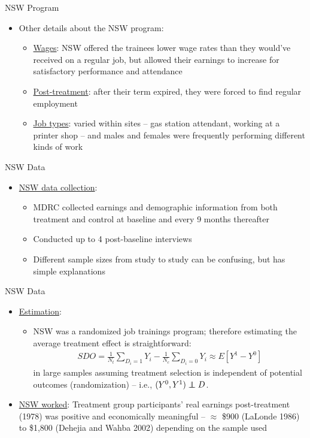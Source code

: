 \documentclass{beamer}
\newcommand\independent{\protect\mathpalette{\protect\independenT}{\perp}}
\def\independenT#1#2{\mathrel{\rlap{$#1#2$}\mkern2mu{#1#2}}}
\begin{document}
\begin{frame}{NSW Program}

\begin{itemize}
	\item Other details about the NSW program:
		\begin{itemize}
		\item \underline{Wages}:  NSW offered the trainees lower wage rates than they would've received on a regular job, but allowed their earnings to increase for satisfactory performance and attendance
		\item \underline{Post-treatment}: after their term expired, they were forced to find regular employment
		\item \underline{Job types}:  varied within sites -- gas station attendant, working at a printer shop -- and males and females were frequently performing different kinds of work
		\end{itemize}
\end{itemize}

\end{frame}
	
\begin{frame}{NSW Data}
	
	\begin{itemize}
	\item \underline{NSW data collection}:
		\begin{itemize}
		\item MDRC collected earnings and demographic information from both treatment and control at baseline and every 9 months thereafter
		\item Conducted up to 4 post-baseline interviews
		\item Different sample sizes from study to study can be confusing, but has simple explanations
		\end{itemize}
	\end{itemize}
\end{frame}
	

\begin{frame}{NSW Data}

\begin{itemize}
	\item \underline{Estimation}:
		\begin{itemize}
		\item NSW was a randomized job trainings program; therefore estimating the average treatment effect is straightforward:
			\begin{eqnarray*}
			SDO = \frac{1}{N_t}\sum_{D_i=1}Y_i - \frac{1}{N_c}\sum_{D_i=0}Y_i \approx E[Y^1-Y^0] 
			\end{eqnarray*}in large samples assuming treatment selection is independent of potential outcomes (randomization) -- i.e., $(Y^0,Y^1)\independent{D}$. 
		\end{itemize}
	\item \underline{NSW worked}: Treatment group participants' real earnings post-treatment (1978) was positive and economically meaningful -- $\approx$ \$900 (LaLonde 1986) to \$1,800 (Dehejia and Wahba 2002) depending on the sample used
\end{itemize}

\end{frame}
	
\end{document}
